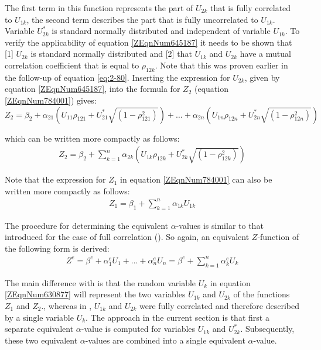 The first term in this function represents the part of $U_{2k}$ that is fully correlated to $U_{1k}$, the second term describes the part that is fully uncorrelated to $U_{1k}$. Variable $U_{2k}^{*}$ is standard normally distributed and independent of variable $U_{1k}$. To verify the applicability of equation \eqref{ZEqnNum645187} it needs to be shown that [1] $U_{2k}$ is standard normally distributed and [2] that $U_{1k}$ and $U_{2k}$ have a mutual correlation coefficient that is equal to $\rho_{12k}$. Note that this was proven earlier in the follow-up of equation \eqref{eq:2-80}. Inserting the expression for $U_{2k}$, given by equation \eqref{ZEqnNum645187}, into the formula for $Z_2$ (equation \eqref{ZEqnNum784001}) gives:
\begin{equation}
Z_{2} =\beta _{2} +\alpha _{21} \left(U_{11} \rho _{121} +U_{21}^{*} \sqrt{(1-\rho _{121}^{2} )} \right)+\dots+\alpha _{2n} \left(U_{1n} \rho _{12n} +U_{2n}^{*} \sqrt{(1-\rho _{12n}^{2} )} \right)\label{0.111)} 
\end{equation}

which can be written more compactly as follows:
\begin{align}
Z_{2} =\beta _{2} +\sum _{k=1}^{n}\alpha _{2k} \left(U_{1k} \rho _{12k} +U_{2k}^{*} \sqrt{(1-\rho _{12k}^{2} )} \right) \label{ZEqnNum452558} 
\end{align}

Note that the expression for $Z_1$ in equation \eqref{ZEqnNum784001} can also be written more compactly as follows:
\begin{align}
Z_{1} =\beta _{1} +\sum _{k=1}^{n}\alpha _{1k} U_{1k}  \label{ZEqnNum898859} 
\end{align}

The procedure for determining the equivalent $\alpha$-values is similar to that introduced for the case of full correlation (). So again, an equivalent $Z$-function of the following form is derived:
\begin{align}
Z^{e} =\beta ^{e} +\alpha _{1}^{e} U_{1} +...+\alpha _{n}^{e} U_{n} =\beta ^{e} +\sum _{k=1}^{n}\alpha _{k}^{e} U_{k}  \label{ZEqnNum630877} 
\end{align}

The main difference with  is that the random variable $U_{k}$ in equation \eqref{ZEqnNum630877} will represent the two variables $U_{1k}$ and $U_{2k}$ of the functions $Z_1$ and $Z_2$., whereas in , $U_{1k}$ and $U_{2k}$ were fully correlated and therefore described by a single variable $U_k$. The approach in the current section is that first a separate equivalent $\alpha$-value is computed for variables $U_{1k}$ and $U_{2k}^{*}$. Subsequently, these two equivalent $\alpha$-values are combined into a single equivalent $\alpha$-value. 

